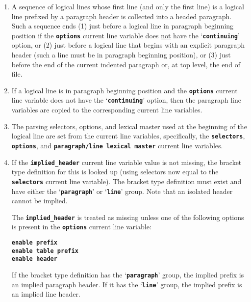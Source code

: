\documentclass[12pt]{article}
\newcommand{\TT}[1]{{\tt \bfseries #1}}
\newcommand{\EOL}{\penalty \exhyphenpenalty}
\begin{document}
\begin{enumerate}

\item
A sequence of logical lines whose first line (and only the first line)
is a logical line prefixed by a paragraph header is collected into a
headed paragraph.  Such a sequence ends (1) just before a logical
line in paragraph beginning position if the \TT{options} current line
variable does \underline{not} have the `\TT{continuing}' option, or
(2) just before a logical line that begins with an explicit paragraph
header (such a line must be in paragraph beginning position),
or (3) just before the end of the current indented paragraph
or, at top level, the end of file.

\item\label{CONTINUING-RULE}
If a logical line is in paragraph beginning position and the
\TT{options} current line variable does not have the `\TT{continuing}'
option, then the paragraph line variables are copied
to the corresponding current line variables.

\item The parsing selectors, options, and lexical master used at the
beginning of the logical line are set from the current line variables,
specifically, the
\TT{selectors},
\TT{options}, and \TT{para\-graph/\EOL line lexical master}
current line variables.

\item\label{IMPLIED-HEADER-PARSING}
If the \TT{implied\_header} current line variable value is not missing,
the bracket type definition for this is looked up (using selectors now
equal to the \TT{selectors} current line variable).
The bracket type definition must exist and have either the `\TT{paragraph}' or
`\TT{line}' group.  Note that an isolated header cannot be implied.

The \TT{implied\_header} is treated as missing unless one of the
following options is present in the \TT{options} current line variable:
\begin{center}
\TT{enable prefix} \\
\TT{enable table prefix} \\
\TT{enable header} \\
\end{center}

If the bracket type definition has the `\TT{paragraph}' group, the
implied prefix is an implied paragraph header.  If it has the `\TT{line}' group,
the implied prefix is an implied line header.


\end{enumerate}
\end{document}
